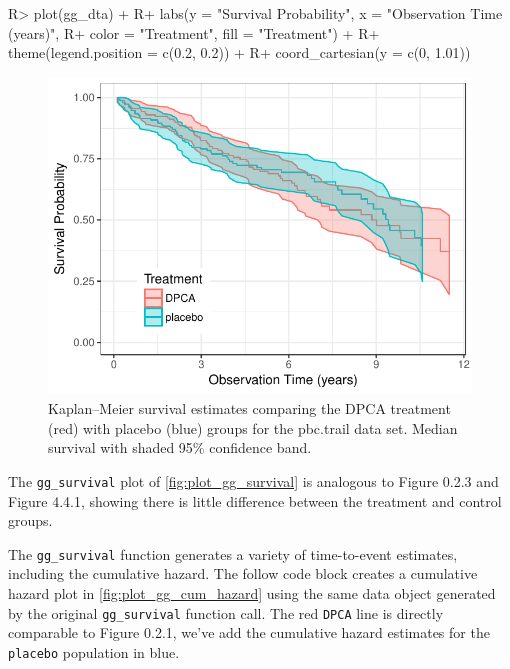\documentclass[article, nojss]{jss}
\begin{document}
\begin{Schunk}
\begin{Sinput}
R> plot(gg_dta) +
R+   labs(y = "Survival Probability", x = "Observation Time (years)",
R+        color = "Treatment", fill = "Treatment") +
R+   theme(legend.position = c(0.2, 0.2)) +
R+   coord_cartesian(y = c(0, 1.01))
\end{Sinput}
\begin{figure}[!htb]

{\centering \includegraphics{rfs-plot_gg_survival-1}

}

\caption[Kaplan--Meier survival estimates comparing the DPCA treatment (red) with placebo (blue) groups for the pbc.trail data set]{Kaplan--Meier survival estimates comparing the DPCA treatment (red) with placebo (blue) groups for the pbc.trail data set. Median survival with shaded 95\% confidence band.}\label{fig:plot_gg_survival}
\end{figure}
\end{Schunk}

The \texttt{gg\_survival} plot of \autoref{fig:plot_gg_survival} is
analogous to\citep{fleming:1991} Figure 0.2.3 and Figure 4.4.1, showing
there is little difference between the treatment and control groups.

The \texttt{gg\_survival} function generates a variety of time-to-event
estimates, including the cumulative hazard. The follow code block
creates a cumulative hazard plot \cite[Figure 0.2.1]{fleming:1991} in
\autoref{fig:plot_gg_cum_hazard} using the same data object generated by
the original \texttt{gg\_survival} function call. The red \texttt{DPCA}
line is directly comparable to Figure 0.2.1, we've add the cumulative
hazard estimates for the \texttt{placebo} population in blue.
\end{document}

